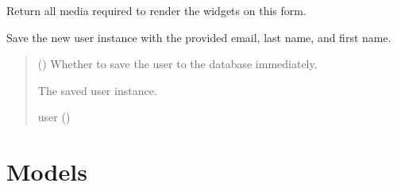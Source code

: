 \documentclass[letterpaper,10pt,english]{sphinxmanual}
\begin{document}
\begin{fulllineitems}

\begin{fulllineitems}
\label{\detokenize{users:users.forms.CustomUserCreationForm.media}}
\pysigstartsignatures
\pysigline
{}
\pysigstopsignatures
\sphinxAtStartPar
Return all media required to render the widgets on this form.

\end{fulllineitems}


\begin{fulllineitems}
\label{\detokenize{users:users.forms.CustomUserCreationForm.save}}
\pysigstartsignatures
\pysiglinewithargsret
{}
{}
{}
\pysigstopsignatures
\sphinxAtStartPar
Save the new user instance with the provided email, last name, and first name.
\begin{quote}\begin{description}
\sphinxAtStartPar
{} () \textendash{} Whether to save the user to the database immediately.

\sphinxAtStartPar
The saved user instance.

\sphinxAtStartPar
user ({\hyperref[\detokenize{users:users.models.CustomUser}]{}})

\end{description}\end{quote}

\end{fulllineitems}


\end{fulllineitems}



\section{Models}
\label{\detokenize{users:module-users.models}}\label{\detokenize{users:models}}
\end{document}
